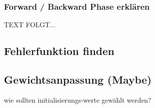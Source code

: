 \subsubsection{Forward / Backward Phase erklären}\label{subsec:backpropagation:forward_backward}
  TEXT FOLGT...

\subsection{Fehlerfunktion finden}\label{subsec:backpropagation:fehlerfunktion}

\subsection{Gewichtsanpassung (Maybe)}\label{subsec:backpropagation:gewichtsanpassung}
wie sollten initialisierungs-werte gewählt werden?
